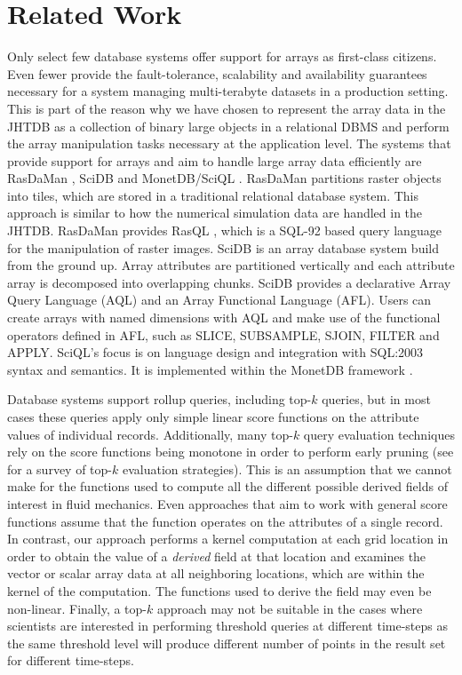 \documentclass{sig-alternate}
\begin{document}
\section{Related Work}
Only select few database systems offer support for arrays as first-class citizens. Even fewer provide the fault-tolerance, scalability and availability guarantees 
necessary for a system managing multi-terabyte datasets in a production setting. This is part of the reason why we have chosen to represent the array
data in the JHTDB as a collection of binary large objects in a relational DBMS and perform the array manipulation tasks necessary at the application level.
The systems that provide
support for arrays and aim to handle large array data efficiently are RasDaMan \cite{Rasdaman}, SciDB \cite{Scidb} and MonetDB/SciQL \cite{Sciql}. RasDaMan
partitions raster objects into tiles, which are stored in a traditional relational database system. This approach is similar to how the numerical simulation data
are handled in the JHTDB. RasDaMan provides RasQL \cite{Rasql}, which is a SQL-92 based query language for the manipulation of raster images. SciDB
is an array database system build from the ground up. Array attributes are partitioned vertically and each attribute array is decomposed into overlapping
chunks. SciDB provides a declarative Array Query Language (AQL) and an Array Functional Language (AFL). Users can create arrays with named
dimensions with AQL and make use of the functional operators defined in AFL, such
as SLICE, SUBSAMPLE, SJOIN, FILTER and APPLY. SciQL's focus is on language design and integration with SQL:2003 syntax and semantics. It is implemented
within the MonetDB framework \cite{MonetDB}.

Database systems support rollup queries, including top-$k$ queries, but in most cases these
queries apply only simple linear score functions on the attribute values of individual records.
Additionally, many top-$k$ query evaluation techniques rely on the score functions being monotone in order to perform early pruning (see \cite{Ilyas} for a
survey of top-$k$ evaluation strategies).
This is an assumption that we cannot make for the functions used to compute all the different possible derived fields of interest in fluid mechanics.
Even approaches that aim to work with general score functions \cite{Deshpande, Xin} assume that the function operates on the attributes of a single record.
In contrast, our approach performs a kernel computation at each grid location in order to obtain the value of a \emph{derived} field at that location and
examines the vector or scalar array data at all neighboring locations, which
are within the kernel of the computation. The functions used to derive the field may even be non-linear.
Finally, a top-$k$ approach may not be suitable in the cases where scientists are interested in performing threshold queries at different time-steps as the
same threshold level will produce different number of points in the result set for different time-steps.
\end{document}
